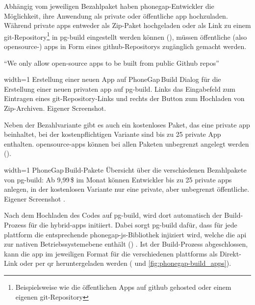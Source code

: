 {Abhängig vom jeweiligen Bezahlpaket haben \gls{phonegap}-Entwickler die Möglichkeit, ihre Anwendung als private oder öffentliche \gls{app} hochzuladen. 
Während private \glspl{app} entweder als Zip-Paket hochgeladen oder als Link zu einem \gls{git}-Repository\footnote{Beispielsweise wie die öffentlichen Apps auf \gls{github} gehosted oder einem eigenen \gls{git}-Repository} in \gls{pg-build} eingestellt werden können (), müssen öffentliche (also \gls{opensource}-) \glspl{app} in Form eines \gls{github}-Repositorys zugänglich gemacht werden.

\begin{quoting}
\enquote{We only allow open-source apps to be built from public Github repos}~\cite{PhoneGap_Build_Apps}
\end{quoting}


	{width=1\textwidth}
	{Erstellung einer neuen App auf PhoneGap\,Build}
		{Dialog für die Erstellung einer neuen privaten \gls{app} auf \gls{pg-build}. Links das Eingabefeld zum Eintragen eines \gls{git}-Repository-Links und rechts der Button zum Hochladen von Zip-Archiven.}
	{Eigener Screenshot.}

Neben der Bezahlvariante gibt es auch ein kostenloses Paket, das eine private \gls{app} beinhaltet, bei der kostenpflichtigen Variante sind bis zu 25 private App enthalten.
\gls{opensource}-\glspl{app} können bei allen Paketen unbegrenzt angelegt werden ().

	{width=1\textwidth}
	{PhoneGap\,Build-Pakete}
		{Übersicht über die verschiedenen Bezahlpakete von \gls{pg-build}: Ab 9,99\,\$ im Monat können Entwickler bis zu 25 private \glspl{app} anlegen, in der kostenlosen Variante nur eine private, aber unbegrenzt öffentliche.}
	{Eigener Screenshot \cite{Adobe_PhoneGap_Build_Plans}.}

Nach dem Hochladen des Codes auf \gls{pg-build}, wird dort automatisch der Build-Prozess für die \glspl{hybrid-app} initiiert.
Dabei sorgt \gls{pg-build} dafür, dass für jede \gls{plattform} die entsprechende \gls{phonegap}-\gls{js}-Bibliothek %
 injiziert wird, welche die \gls{api} zur nativen Betriebssystemebene enthält () \cite{PhoneGap_Build_Documentation_getting-started}.
Ist der Build-Prozess abgeschlossen, kann die \gls{app} im jeweiligen Format für die verschiedenen \glspl{plattform} als Direkt-Link oder per \gls{qr} heruntergeladen werden ( und \ref{fig:phonegap-build_apps}).


}

